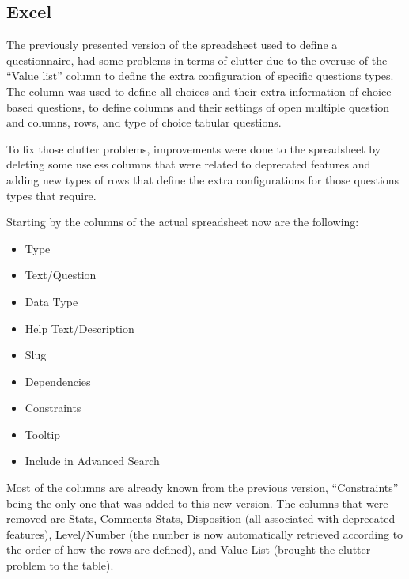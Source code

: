 \subsection{Excel}


The previously presented version of the spreadsheet used to define a questionnaire, had some problems in terms of clutter due to the overuse of the ``Value list'' column to define the extra configuration of specific questions types.
The column was used to define all choices and their extra information of choice-based questions, to define columns and their settings of open multiple question and columns, rows, and type of choice tabular questions.

To fix those clutter problems, improvements were done to the spreadsheet by deleting some useless columns that were related to deprecated features and adding new types of rows that define the extra configurations for those questions types that require.

Starting by the columns of the actual spreadsheet now are the following:

\begin{itemize}
    \item Type
    \item Text/Question
    \item Data Type
    \item Help Text/Description
    \item Slug
    \item Dependencies
    \item Constraints
    \item Tooltip
    \item Include in Advanced Search
\end{itemize}

Most of the columns are already known from the previous version, ``Constraints'' being the only one that was added to this new version.
The columns that were removed are Stats, Comments Stats, Disposition (all associated with deprecated features), Level/Number (the number is now automatically retrieved according to the order of how the rows are defined), and Value List (brought the clutter problem to the table).

